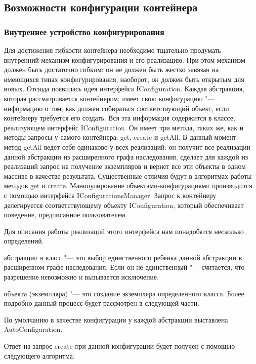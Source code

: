 \subsection{Возможности конфигурации контейнера}

\subsubsection{Внутреннее устройство конфигурирования}

Для достижения гибкости контейнера необходимо тщательно продумать внутренний механизм конфигурирования и его реализацию. При этом механизм должен быть достаточно гибким:
он не должен быть жестко завязан на имеющихся типах конфигурирования, наоборот, он должен быть открытым для новых. Отсюда появилась идея интерфейса IConfiguration.
Каждая абстракция, которая рассматривается контейнером, имеет свою конфигурацию "--- информацию о том, как должен собираться соответствующий объект, если контейнеру требуется его создать.
Вся эта информация содержится в классе, реализующем интерфейс IConfiguration. Он имеет три метода, таких же, как и методы-запросы у самого контейнера: get, create и getAll.
В данный момент метод getAll ведет себя одинаково у всех реализаций: он получит все реализации данной абстракции из расширенного графа наследования, 
сделает для каждой из реализаций запрос на получение экземпляров и вернет все эти объекты в одном массиве в качестве результата.
Существенные отличия будут в алгоритмах работы методов get и create.
Манипулирование объектами-конфигурациями производится с помощью интерфейса IConfigurationsManager.
Запрос к контейнеру делегируется соответствующему объекту IConfiguration, который обеспечивает поведение, предписанное пользователем.

Для описания работы реализаций этого интерфейса нам понадобятся несколько определений.

 абстракции в класс \upshape"--- это выбор единственного ребенка данной абстракции в расширенном графе наследования. Если он не единственный "--- считается, что разрешение
невозможно и вызывается исключение.

 объекта (экземпляра) \upshape"--- это создание экземпляра определенного класса. Более подробно данный процесс будет рассмотрен в следующей части.

По умолчанию в качестве конфигурации у каждой абстракции выставлена AutoConfiguration. 

Ответ на запрос create при данной конфигурации будет получен с помощью следующего алгоритма:

